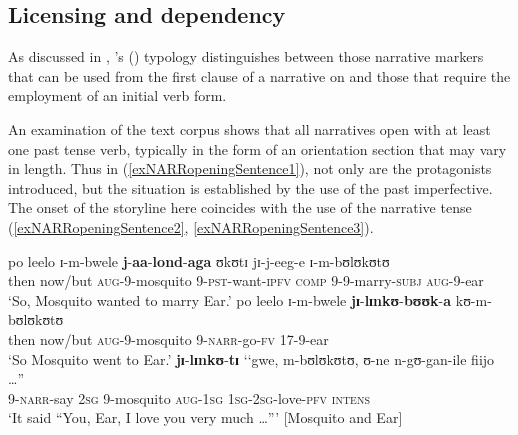 \subsection{Licensing and dependency}\label{NarrativeMarkersLicensingDependency}
As discussed in , \citeauthor{LongacreR1990}'s (\citeyear{LongacreR1990}) typology distinguishes between those narrative markers that can be used from the first clause of a narrative on and those that require the employment of an initial verb form.

An examination of the text corpus shows that all narratives open with at least one past tense verb, typically in the form of an orientation section that may vary in length. Thus in (\ref{exNARRopeningSentence1}), not only are the protagonists introduced, but the situation is established by the use of the past imperfective. The onset of the storyline here coincides with the use of the narrative tense (\ref{exNARRopeningSentence2}, \ref{exNARRopeningSentence3}).

\begin{exe}
	\ex \label{exNARRopening}
	\begin{xlist}
		\ex \label{exNARRopeningSentence1} \gll po leelo ɪ-m-bwele \textbf{j}-\textbf{aa}-\textbf{lond}-\textbf{aga} ʊkʊtɪ jɪ-j-eeg-e ɪ-m-bʊlʊkʊtʊ\\
		then now/but \textsc{aug}-9-mosquito 9-\textsc{pst}-want-\textsc{ipfv} \textsc{comp} 9-9-marry-\textsc{subj} \textsc{aug}-9-ear\\
		\glt `So, Mosquito wanted to marry Ear.'
		\ex \label{exNARRopeningSentence2}\gll po leelo ɪ-m-bwele \textbf{jɪ}-\textbf{lɪnkʊ}-\textbf{bʊʊk}-\textbf{a} kʊ-m-bʊlʊkʊtʊ\\
		then now/but \textsc{aug}-9-mosquito 9-\textsc{narr}-go-\textsc{fv} 17-9-ear\\
		\glt `So Mosquito went to Ear.'
		\ex \label{exNARRopeningSentence3}\gll \textbf{jɪ}-\textbf{lɪnkʊ}-\textbf{tɪ} \textup{\lq\lq}gwe, m-bʊlʊkʊtʊ, ʊ-ne n-gʊ-gan-ile fiijo \ldots\textup{''}\\
		9-\textsc{narr}-say \phantom{\lq\lq}\textsc{2sg} 9-mosquito \textsc{aug}-\textsc{1sg} \textsc{1sg}-\textsc{2sg}-love-\textsc{pfv} \textsc{intens}\\
		\glt `It said ``You, Ear, I love you very much \ldots''{}' [Mosquito and Ear]
	\end{xlist}
\end{exe}

